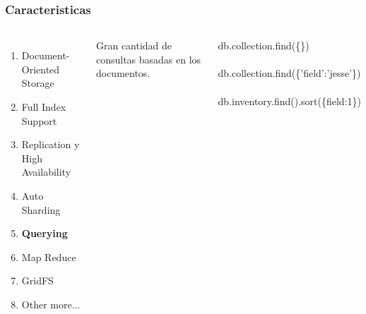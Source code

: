 \documentclass{beamer}
\begin{document}
\begin{frame}
\frametitle{Caracteristicas}
\begin{columns}[c] %

\begin{enumerate}
\item Document-Oriented Storage
\item Full Index Support
\item Replication y High Availability
\item Auto Sharding
\item \textbf{Querying}
\item Map Reduce
\item GridFS
\item Other more...
\end{enumerate}

Gran cantidad de consultas basadas en los documentos.
\begin{example}[querys]
db.collection.find(\{\})
\\~\\
db.collection.find(\{'field':'jesse'\})
\\~\\
db.inventory.find().sort(\{field:1\})
\end{example}
\end{columns}
\end{frame}
\end{document}
